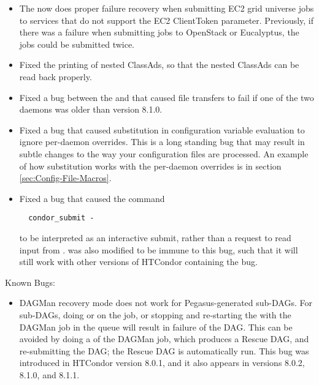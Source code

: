\begin{itemize}

\item The  now does proper failure recovery when
submitting EC2 grid universe jobs to services that do not support 
the EC2 ClientToken parameter.
Previously, if there was a failure when submitting jobs to OpenStack
or Eucalyptus, the jobs could be submitted twice.

\item Fixed the printing of nested ClassAds, so that the nested ClassAds
can be read back properly.

\item Fixed a bug between the  and 
that caused file transfers to fail if one of the two daemons was older
than version 8.1.0.

\item Fixed a bug that caused substitution in configuration variable
evaluation to ignore per-daemon overrides. 
This is a long standing bug that may result in subtle changes
to the way your configuration files are processed.
An example of how substitution works with the per-daemon overrides
is in section \ref{sec:Config-File-Macros}.

\item Fixed a bug that caused the command
\begin{verbatim}
  condor_submit -
\end{verbatim}
to be interpreted as an interactive submit,
rather than a request to read input from .
 was also modified to be immune to this bug,
such that it will still work with other versions of HTCondor containing
the bug.

\end{itemize}

\noindent Known Bugs:

\begin{itemize}
\item DAGMan recovery mode does not work for Pegasus-generated sub-DAGs.
For sub-DAGs, doing  or  on
the  job, or stopping and re-starting the
 with the DAGMan
job in the queue will result in failure of the DAG.  This can be
avoided by doing a  of the DAGMan job, which produces a Rescue
DAG, and re-submitting the DAG; the Rescue DAG is automatically run.
This bug was introduced in HTCondor version 8.0.1, and it also appears
in versions 8.0.2, 8.1.0, and 8.1.1.

\end{itemize}

